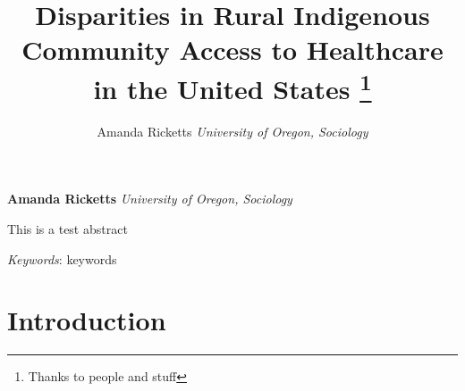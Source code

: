 \documentclass[11pt,]{article}
\title{Disparities in Rural Indigenous Community Access to Healthcare in the
United States \thanks{Thanks to people and stuff}  }
\author{\Large Amanda Ricketts\vspace{0.05in} \newline\normalsize\emph{University of Oregon, Sociology}  }
\date{}
\newcommand*{\authorfont}{\fontfamily{phv}\selectfont}
\renewenvironment{abstract}
 {{%
    \setlength{\leftmargin}{0mm}
    \setlength{\rightmargin}{\leftmargin}%
  }%
  \relax}
 {\endlist}
\begin{document}
%



{%
\setlength{\parindent}{0pt}
\thispagestyle{plain}
{\fontsize{18}{20}\selectfont\raggedright
\maketitle  %

}

{
   \vskip 13.5pt\relax \normalsize\fontsize{11}{12}
\textbf{\authorfont Amanda Ricketts} \hskip 15pt \emph{\small University of Oregon, Sociology}   

}

}







\begin{abstract}

    \hbox{\vrule height .2pt width 39.14pc}

    \vskip 8.5pt %

\noindent This is a test abstract


\vskip 8.5pt \noindent \emph{Keywords}: keywords \par

    \hbox{\vrule height .2pt width 39.14pc}



\end{abstract}


\vskip 6.5pt

\noindent  \hypertarget{introduction}{%
\section{Introduction}\label{introduction}}
\end{document}
